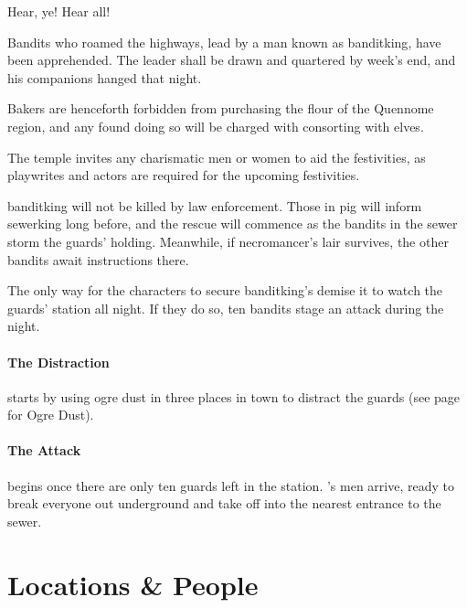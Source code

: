 \begin{multicols}{2}
\begin{boxtext}
	Hear, ye!  Hear all!

	Bandits who roamed the highways, lead by a man known as \gls{banditking}, have been apprehended.  The leader shall be drawn and quartered by week's end, and his companions hanged that night.

	Bakers are henceforth forbidden from purchasing the flour of the Quennome region, and any found doing so will be charged with consorting with elves.

	The temple invites any charismatic men or women to aid the festivities, as playwrites and actors are required for the upcoming festivities.

\end{boxtext}

\Gls{banditking} will not be killed by law enforcement.
Those in \gls{pig} will inform \gls{sewerking} long before, and the rescue will commence as the bandits in the sewer storm the guards' holding.
Meanwhile, if \gls{necromancer}'s lair survives, the other bandits await instructions there.

The only way for the characters to secure \gls{banditking}'s demise it to watch the guards' station all night.
If they do so, ten bandits stage an attack during the night.

\paragraph{The Distraction} starts by using ogre dust in three places in town to distract the guards (see page \pageref{ogredust} for Ogre Dust).

\paragraph{The Attack}
begins once there are only ten guards left in the station.
's men arrive, ready to break everyone out underground and take off into the nearest entrance to the sewer.


\stopcontents[sq]

\end{multicols}

\section{Locations \& People}

\label{redfall_map}

